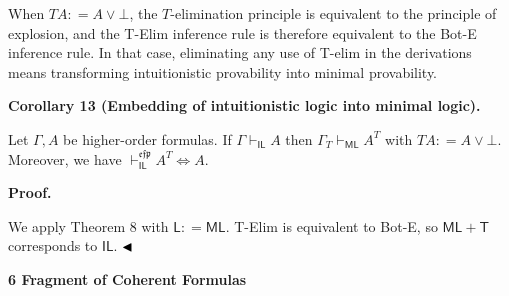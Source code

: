  
 
When $TA\mathrel{\mathop{:}}=A\mathbin{\vee}\bot$, the $T$-elimination principle is equivalent to the principle of explosion, and the T-Elim inference rule is therefore equivalent to the Bot-E inference rule. In that case, eliminating any use of T-elim in the derivations means transforming intuitionistic provability into minimal provability.\par
 
 
 
\par\medskip\noindent\textbf{Corollary 13 (Embedding of intuitionistic logic into minimal logic).}\par
 
 
Let $\Gamma,A$ be higher-order formulas. If $\Gamma\vdash_{\mathsf{IL}}A$ then $\Gamma_{T}\vdash_{\mathsf{ML}}A^{T}$ with $TA\mathrel{\mathop{:}}=A\mathbin{\vee}\bot$. Moreover, we have $\vdash_{\mathsf{IL}}^{\mathfrak{e}\mathfrak{f}\mathfrak{p}}A^{T}\Leftrightarrow
A$.\par
 
 
 
 
 
\par\medskip\noindent\textbf{Proof.}\par
 
 
We apply Theorem 8 with $\mathsf{L}\mathrel{\mathop{:}}=\mathsf{ML}$. T-Elim is equivalent to Bot-E, so $\mathsf{ML}+\mathsf{T}$ corresponds to $\mathsf{IL}$. $\hfill\blacktriangleleft$\par
 
 
 


 
\par\medskip\noindent\textbf{6 Fragment of Coherent Formulas}\par
 
 
